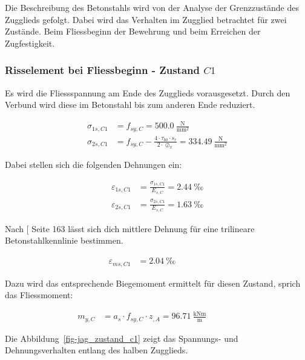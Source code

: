 \documentclass[
  11pt,
  letterpaper,
]{scrreprt}
\begin{document}
Die Beschreibung des Betonstahls wird von der Analyse der Grenzzustände
des Zugglieds gefolgt. Dabei wird das Verhalten im Zugglied betrachtet
für zwei Zustände. Beim Fliessbeginn der Bewehrung und beim Erreichen
der Zugfestigkeit.

\subsubsection{\texorpdfstring{Risselement bei Fliessbeginn - Zustand
\(C1\)}{Risselement bei Fliessbeginn - Zustand C1}}\label{risselement-bei-fliessbeginn---zustand-c1}

Es wird die Fliessspannung am Ende des Zugglieds vorausgesetzt. Durch
den Verbund wird diese im Betonstahl bis zum anderen Ende reduziert.

\[
\begin{aligned}
\sigma_{1 s , C1}& = f_{sy , C} = 500.0 \ \frac{\mathrm{N}}{\mathrm{mm}^{2}} \\ 
\sigma_{2 s , C1}& = f_{sy , C} - \frac{4 \cdot \tau_{b0} \cdot s_{r}}{2 \cdot \oslash_{x}} = 334.49 \ \frac{\mathrm{N}}{\mathrm{mm}^{2}} \end{aligned}
\]

Dabei stellen sich die folgenden Dehnungen ein:

\[
\begin{aligned}
\varepsilon_{1 s , C1}& = \frac{\sigma_{1 s , C1}}{E_{s , C}} = 2.44 \ \mathrm{‰} \\ 
\varepsilon_{2 s , C1}& = \frac{\sigma_{2 s , C1}}{E_{s , C}} = 1.63 \ \mathrm{‰} \end{aligned}
\]

Nach {[}\citeproc{ref-alvarez_einfluss_1998}{10}{]} Seite 163 lässt sich
dich mittlere Dehnung für eine trilineare Betonstahlkennlinie bestimmen.

\[
\begin{aligned}
\varepsilon_{m s , C1}& = 2.04 \ \mathrm{‰} \quad &  \quad &  
 \end{aligned}
\]

Dazu wird das entsprechende Biegemoment ermittelt für diesen Zustand,
sprich das Fliessmoment:

\[
\begin{aligned}
m_{y , C}& = a_{s} \cdot f_{sy , C} \cdot z_{, A} = 96.71 \ \frac{\mathrm{kNm}}{\mathrm{m}} \quad &  \quad &  
 \end{aligned}
\]

Die Abbildung~\ref{fig-jag_zustand_c1} zeigt das Spannungs- und
Dehnungsverhalten entlang des halben Zugglieds.
\end{document}

